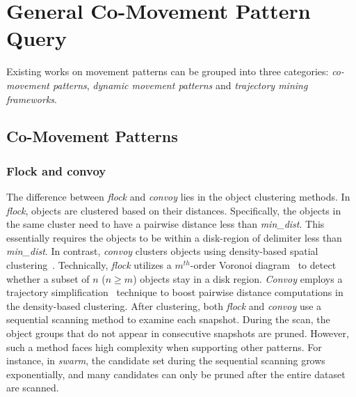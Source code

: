 \section{General Co-Movement Pattern Query}
\label{sec:related_work:trajectory}
Existing works on movement patterns can be grouped into three categories: \emph{co-movement patterns},
\emph{dynamic movement patterns} and \emph{trajectory mining frameworks}.
\subsection{Co-Movement Patterns}
\subsubsection{Flock and convoy}
The difference between \emph{flock} and \emph{convoy} lies 
in the object clustering methods. In \emph{flock},
objects are clustered based on their distances. Specifically, the
objects in the same cluster need to have a pairwise distance less than \emph{min\_dist}. 
This essentially requires the objects to be within a disk-region of delimiter less than \emph{min\_dist}.  
In contrast, \emph{convoy} clusters objects using density-based spatial clustering~\cite{ester1996density}.
Technically, \emph{flock} utilizes a $m^{th}$-order Voronoi diagram~\cite{laube2005finding} to detect whether
a subset of $n$ ($n \geq m$) objects stay in a disk region.
\emph{Convoy} employs
a trajectory simplification~\cite{douglas1973linesimplification} technique to boost pairwise distance computations in
the density-based clustering.
After clustering, both \emph{flock} and \emph{convoy} use a sequential scanning
method to examine each snapshot. 
During the scan, the object groups that do 
not appear in consecutive snapshots are pruned.
However, such a method faces high complexity when supporting other patterns.
For instance, in \emph{swarm}, the candidate set during the sequential scanning grows
exponentially, and many candidates can only be pruned after the entire dataset are scanned.

